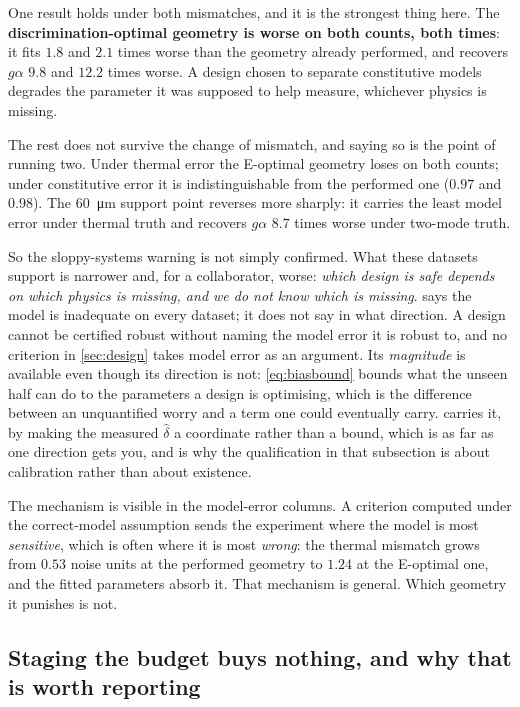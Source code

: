 \documentclass[10pt]{article}
\begin{document}
\noindent One result holds under both mismatches, and it is the strongest thing here. The
\textbf{discrimination-optimal geometry is worse on both counts, both times}: it fits $1.8$ and
$2.1$ times worse than the geometry already performed, and recovers $g\alpha$ $9.8$ and $12.2$
times worse. A design chosen to separate constitutive models degrades the parameter it was
supposed to help measure, whichever physics is missing.

The rest does not survive the change of mismatch, and saying so is the point of running two.
Under thermal error the E-optimal geometry loses on both counts; under constitutive error it is
indistinguishable from the performed one ($0.97$ and $0.98$). The \SI{60}{\micro\metre} support
point reverses more sharply: it carries the least model error under thermal truth and recovers
$g\alpha$ $8.7$ times worse under two-mode truth.

So the sloppy-systems warning is not simply confirmed. What these datasets support is narrower
and, for a collaborator, worse: \emph{which design is safe depends on which physics is missing,
and we do not know which is missing}.  says the model is inadequate on every
dataset; it does not say in what direction. A design cannot be certified robust without naming
the model error it is robust to, and no criterion in \cref{sec:design} takes model error as an
argument. Its \emph{magnitude} is available even though its direction is not:
\cref{eq:biasbound} bounds what the unseen half can do to the parameters a design is
optimising, which is the difference between an unquantified worry and a term one could
eventually carry.  carries it, by making the measured $\hat\delta$ a
coordinate rather than a bound, which is as far as one direction gets you, and is why the
qualification in that subsection is about calibration rather than about existence.

The mechanism is visible in the model-error columns. A criterion computed under the
correct-model assumption sends the experiment where the model is most \emph{sensitive}, which is
often where it is most \emph{wrong}: the thermal mismatch grows from $0.53$ noise units at the
performed geometry to $1.24$ at the E-optimal one, and the fitted parameters absorb it. That
mechanism is general. Which geometry it punishes is not.

\subsection*{Staging the budget buys nothing, and why that is worth reporting}
\end{document}
